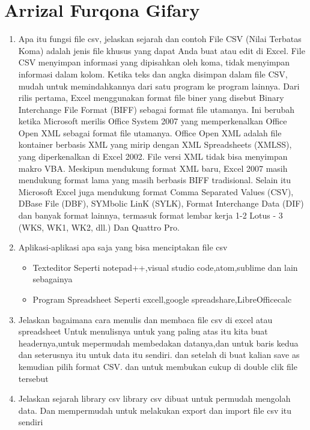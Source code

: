 \section{Arrizal Furqona Gifary}
\begin{enumerate}
    \item Apa itu fungsi file csv, jelaskan sejarah dan contoh
    File CSV (Nilai Terbatas Koma) adalah jenis file khusus yang dapat Anda buat atau edit di Excel. File CSV menyimpan informasi yang dipisahkan oleh koma, tidak menyimpan informasi dalam kolom. Ketika teks dan angka disimpan dalam file CSV, mudah untuk memindahkannya dari satu program ke program lainnya.
    Dari rilis pertama, Excel menggunakan format file biner yang disebut Binary Interchange File Format (BIFF) sebagai format file utamanya. Ini berubah ketika Microsoft merilis Office System 2007 yang memperkenalkan Office Open XML sebagai format file utamanya. Office Open XML adalah file kontainer berbasis XML yang mirip dengan XML Spreadsheets (XMLSS), yang diperkenalkan di Excel 2002. File versi XML tidak bisa menyimpan makro VBA.
    Meskipun mendukung format XML baru, Excel 2007 masih mendukung format lama yang masih berbasis BIFF tradisional. Selain itu Microsoft Excel juga mendukung format Comma Separated Values (CSV), DBase File (DBF), SYMbolic LinK (SYLK), Format Interchange Data (DIF) dan banyak format lainnya, termasuk format lembar kerja 1-2 Lotus - 3 (WKS, WK1, WK2, dll.) Dan Quattro Pro.
    \item Aplikasi-aplikasi apa saja yang bisa menciptakan file csv
    \begin{itemize}
        \item Texteditor
        Seperti notepad++,visual studio code,atom,sublime dan lain sebagainya
        \item Program Spreadsheet
        Seperti excell,google spreadshare,LibreOfficecalc
    \end{itemize}
    \item Jelaskan bagaimana cara menulis dan membaca file csv di excel atau spreadsheet
    Untuk menulisnya untuk yang paling atas itu kita buat headernya,untuk mepermudah membedakan datanya,dan untuk baris kedua dan seterusnya itu untuk data itu sendiri.
    dan setelah di buat kalian save as kemudian pilih format CSV.
    dan untuk membukan cukup di double clik file tersebut
    \item Jelaskan sejarah library csv
    library csv dibuat untuk permudah mengolah data. Dan mempermudah untuk melakukan export dan import file csv itu sendiri

\end{enumerate}
